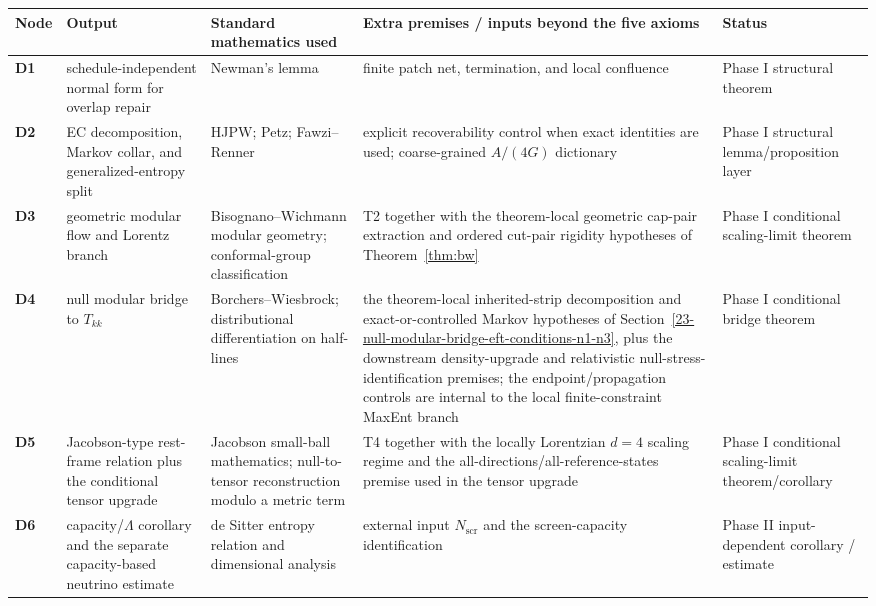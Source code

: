 \begingroup
\scriptsize
{\def\LTcaptype{none}
\setlength{\tabcolsep}{2pt}
\begin{longtable}[]{@{}>{\RaggedRight\arraybackslash}p{}>{\RaggedRight\arraybackslash}p{}>{\RaggedRight\arraybackslash}p{}>{\RaggedRight\arraybackslash}p{}>{\RaggedRight\arraybackslash}p{}@{}}
\toprule\noalign{}
Node & Output & Standard mathematics used & Extra premises / inputs beyond the five axioms & Status \\
\midrule\noalign{}
\endhead
\bottomrule\noalign{}
\endlastfoot
\textbf{D1} & schedule-independent normal form for overlap repair & Newman's lemma & finite patch net, termination, and local confluence & Phase I structural theorem \\
\textbf{D2} & EC decomposition, Markov collar, and generalized-entropy split & HJPW; Petz; Fawzi--Renner & explicit recoverability control when exact identities are used; coarse-grained \(A/(4G)\) dictionary & Phase I structural lemma/proposition layer \\
\textbf{D3} & geometric modular flow and Lorentz branch & Bisognano--Wichmann modular geometry; conformal-group classification & T2 together with the theorem-local geometric cap-pair extraction and ordered cut-pair rigidity hypotheses of Theorem~\ref{thm:bw} & Phase I conditional scaling-limit theorem \\
\textbf{D4} & null modular bridge to \(T_{kk}\) & Borchers--Wiesbrock; distributional differentiation on half-lines & the theorem-local inherited-strip decomposition and exact-or-controlled Markov hypotheses of Section~\ref{23-null-modular-bridge-eft-conditions-n1-n3}, plus the downstream density-upgrade and relativistic null-stress-identification premises; the endpoint/propagation controls are internal to the local finite-constraint MaxEnt branch & Phase I conditional bridge theorem \\
\textbf{D5} & Jacobson-type rest-frame relation plus the conditional tensor upgrade & Jacobson small-ball mathematics; null-to-tensor reconstruction modulo a metric term & T4 together with the locally Lorentzian \(d=4\) scaling regime and the all-directions/all-reference-states premise used in the tensor upgrade & Phase I conditional scaling-limit theorem/corollary \\
\textbf{D6} & capacity/\(\Lambda\) corollary and the separate capacity-based neutrino estimate & de Sitter entropy relation and dimensional analysis & external input \(N_{\mathrm{scr}}\) and the screen-capacity identification & Phase II input-dependent corollary / estimate \\

\end{longtable}}
